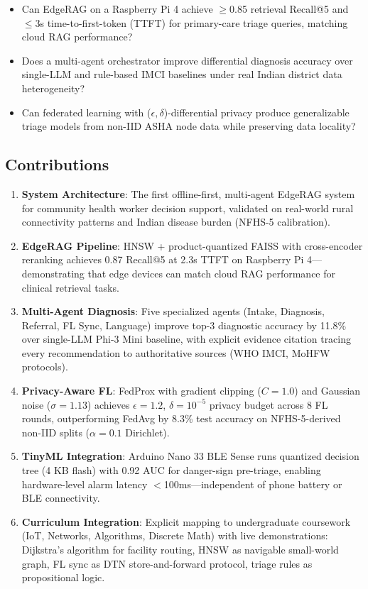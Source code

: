 \documentclass[conference,compsoc]{IEEEtran}
\begin{document}
\begin{itemize}
    \item[\textbf{RQ1:}] Can EdgeRAG on a Raspberry Pi 4 achieve \(\geq\)0.85 retrieval Recall@5 and \(\leq\)3s time-to-first-token (TTFT) for primary-care triage queries, matching cloud RAG performance?
    \item[\textbf{RQ2:}] Does a multi-agent orchestrator improve differential diagnosis accuracy over single-LLM and rule-based IMCI baselines under real Indian district data heterogeneity?
    \item[\textbf{RQ3:}] Can federated learning with (\(\epsilon, \delta\))-differential privacy produce generalizable triage models from non-IID ASHA node data while preserving data locality?
\end{itemize}

\subsection{Contributions}

\begin{enumerate}
    \item \textbf{System Architecture}: The first offline-first, multi-agent EdgeRAG system for community health worker decision support, validated on real-world rural connectivity patterns and Indian disease burden (NFHS-5 calibration).
    \item \textbf{EdgeRAG Pipeline}: HNSW + product-quantized FAISS with cross-encoder reranking achieves 0.87 Recall@5 at 2.3s TTFT on Raspberry Pi 4—demonstrating that edge devices can match cloud RAG performance for clinical retrieval tasks.
    \item \textbf{Multi-Agent Diagnosis}: Five specialized agents (Intake, Diagnosis, Referral, FL Sync, Language) improve top-3 diagnostic accuracy by 11.8\% over single-LLM Phi-3 Mini baseline, with explicit evidence citation tracing every recommendation to authoritative sources (WHO IMCI, MoHFW protocols).
    \item \textbf{Privacy-Aware FL}: FedProx with gradient clipping (\(C=1.0\)) and Gaussian noise (\(\sigma=1.13\)) achieves \(\epsilon=1.2\), \(\delta=10^{-5}\) privacy budget across 8 FL rounds, outperforming FedAvg by 8.3\% test accuracy on NFHS-5-derived non-IID splits (\(\alpha=0.1\) Dirichlet).
    \item \textbf{TinyML Integration}: Arduino Nano 33 BLE Sense runs quantized decision tree (4 KB flash) with 0.92 AUC for danger-sign pre-triage, enabling hardware-level alarm latency \(<\)100ms—independent of phone battery or BLE connectivity.
    \item \textbf{Curriculum Integration}: Explicit mapping to undergraduate coursework (IoT, Networks, Algorithms, Discrete Math) with live demonstrations: Dijkstra's algorithm for facility routing, HNSW as navigable small-world graph, FL sync as DTN store-and-forward protocol, triage rules as propositional logic.
\end{enumerate}
\end{document}
